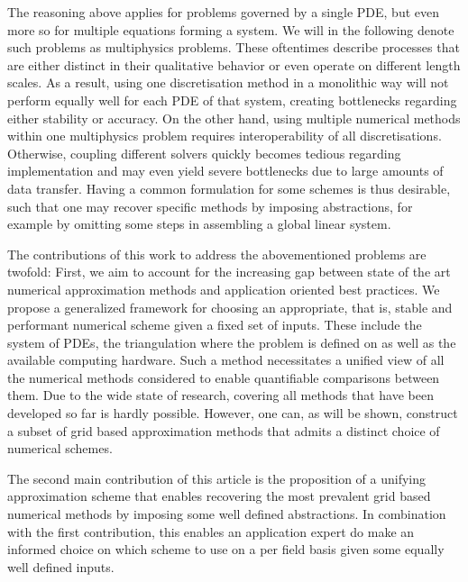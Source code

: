 \documentclass[sn-mathphys,Numbered]{sn-jnl}%
\theoremstyle{thmstyleone}%
\theoremstyle{thmstyletwo}%
\theoremstyle{thmstylethree}%
\begin{document}
The reasoning above applies for problems governed by a single PDE, but even more so for multiple equations forming a system.
We will in the following denote such problems as multiphysics problems.
These oftentimes describe processes that are either distinct in their qualitative behavior or even operate on different length scales.
As a result, using one discretisation method in a monolithic way will not perform equally well for each PDE of that system, creating bottlenecks regarding either stability or accuracy.
On the other hand, using multiple numerical methods within one multiphysics problem requires interoperability of all discretisations.
Otherwise, coupling different solvers quickly becomes tedious regarding implementation and may even yield severe bottlenecks due to large amounts of data transfer.
Having a common formulation for some schemes is thus desirable, such that one may recover specific methods by imposing abstractions, for example by omitting some steps in assembling a global linear system.

The contributions of this work to address the abovementioned problems are twofold:
First, we aim to account for the increasing gap between state of the art numerical approximation methods and application oriented best practices.
We propose a generalized framework for choosing an appropriate, that is, stable and performant numerical scheme given a fixed set of inputs.
These include the system of PDEs, the triangulation where the problem is defined on as well as the available computing hardware.
Such a method necessitates a unified view of all the numerical methods considered to enable quantifiable comparisons between them.
Due to the wide state of research, covering all methods that have been developed so far is hardly possible.
However, one can, as will be shown, construct a subset of grid based approximation methods that admits a distinct choice of numerical schemes.

The second main contribution of this article is the proposition of a unifying approximation scheme that enables recovering the most prevalent grid based numerical methods by imposing some well defined abstractions.
In combination with the first contribution, this enables an application expert do make an informed choice on which scheme to use on a per field basis given some equally well defined inputs.
\end{document}
